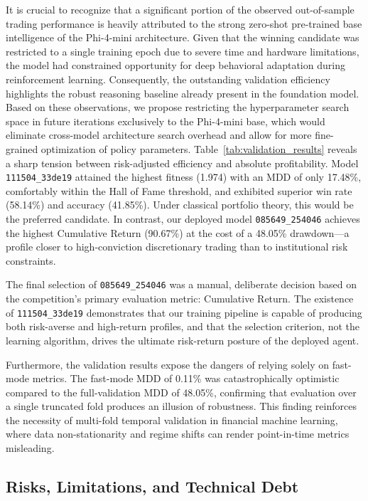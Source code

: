     It is crucial to recognize that a significant portion of the observed out-of-sample trading performance is heavily attributed to the strong zero-shot pre-trained base intelligence of the Phi-4-mini architecture. Given that the winning candidate was restricted to a single training epoch due to severe time and hardware limitations, the model had constrained opportunity for deep behavioral adaptation during reinforcement learning. Consequently, the outstanding validation efficiency highlights the robust reasoning baseline already present in the foundation model. Based on these observations, we propose restricting the hyperparameter search space in future iterations exclusively to the Phi-4-mini base, which would eliminate cross-model architecture search overhead and allow for more fine-grained optimization of policy parameters. Table~\ref{tab:validation_results} reveals a sharp tension between risk-adjusted efficiency and absolute profitability. Model \texttt{111504\_33de19} attained the highest fitness (1.974) with an MDD of only 17.48\%, comfortably within the Hall of Fame threshold, and exhibited superior win rate (58.14\%) and accuracy (41.85\%). Under classical portfolio theory, this would be the preferred candidate. In contrast, our deployed model \texttt{085649\_254046} achieves the highest Cumulative Return (90.67\%) at the cost of a 48.05\% drawdown---a profile closer to high-conviction discretionary trading than to institutional risk constraints.


    The final selection of \texttt{085649\_254046} was a manual, deliberate decision based on the competition's primary evaluation metric: Cumulative Return. The existence of \texttt{111504\_33de19} demonstrates that our training pipeline is capable of producing both risk-averse and high-return profiles, and that the selection criterion, not the learning algorithm, drives the ultimate risk-return posture of the deployed agent.

    Furthermore, the validation results expose the dangers of relying solely on fast-mode metrics. The fast-mode MDD of 0.11\% was catastrophically optimistic compared to the full-validation MDD of 48.05\%, confirming that evaluation over a single truncated fold produces an illusion of robustness. This finding reinforces the necessity of multi-fold temporal validation in financial machine learning, where data non-stationarity and regime shifts can render point-in-time metrics misleading.

    \subsection{Risks, Limitations, and Technical Debt}

